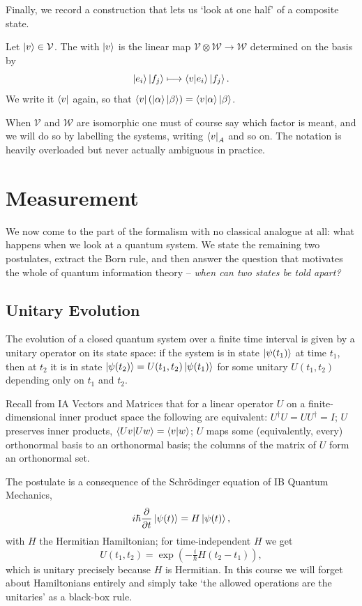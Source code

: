 \documentclass[a4paper]{scrartcl}
\newcommand{\Vs}{\mathcal{V}}
\newcommand{\Ws}{\mathcal{W}}
\begin{document}
Finally, we record a construction that lets us `look at one half' of a composite state.

\begin{definition}
	Let $\ket{v} \in \Vs$. The  with $\ket{v}$ is the linear map $\Vs\otimes\Ws \to \Ws$ determined on the basis by
	$$\ket{e_i}\ket{f_j} \longmapsto \ip{v}{e_i}\ket{f_j}.$$
	We write it $\bra{v}$ again, so that $\bra{v}\left(\ket{\alpha}\ket{\beta}\right) = \ip{v}{\alpha}\ket{\beta}$.
\end{definition}

When $\Vs$ and $\Ws$ are isomorphic one must of course say which factor is meant, and we will do so by labelling the systems, writing $\bra{v}_A$ and so on. The notation is heavily overloaded but never actually ambiguous in practice.

\section{Measurement}

We now come to the part of the formalism with no classical analogue at all: what happens when we look at a quantum system. We state the remaining two postulates, extract the Born rule, and then answer the question that motivates the whole of quantum information theory -- \emph{when can two states be told apart?}

\subsection{Unitary Evolution}

\begin{axiom}[Evolution]
	The evolution of a closed quantum system over a finite time interval is given by a unitary operator on its state space: if the system is in state $\ket{\psi(t_1)}$ at time $t_1$, then at $t_2$ it is in state $\ket{\psi(t_2)} = U(t_1,t_2)\ket{\psi(t_1)}$ for some unitary $U(t_1,t_2)$ depending only on $t_1$ and $t_2$.
\end{axiom}

Recall from IA Vectors and Matrices that for a linear operator $U$ on a finite-dimensional inner product space the following are equivalent: $U^\dagger U = UU^\dagger = I$; $U$ preserves inner products, $\ip{Uv}{Uw} = \ip{v}{w}$; $U$ maps some (equivalently, every) orthonormal basis to an orthonormal basis; the columns of the matrix of $U$ form an orthonormal set.

The postulate is a consequence of the Schr\"odinger equation of IB Quantum Mechanics,
$$i\hbar \frac{\partial}{\partial t}\ket{\psi(t)} = H \ket{\psi(t)},$$
with $H$ the Hermitian Hamiltonian; for time-independent $H$ we get
$$U(t_1,t_2) = \exp\!\left(-\tfrac{i}{\hbar}H(t_2-t_1)\right),$$
which is unitary precisely because $H$ is Hermitian. In this course we will forget about Hamiltonians entirely and simply take `the allowed operations are the unitaries' as a black-box rule.
\end{document}
